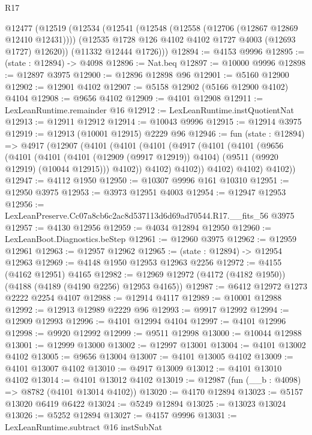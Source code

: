 \begin{lexlean}{R17}
\begin{coremodule}
  @12477
    (@12519
      (@12534
        (@12541
          (@12548 (@12558 (@12706 (@12867 @12869 @12410 @12431))))
          (@12535 @1728 @126 @4102 @4102 @1727 @4003 (@12693 @1727) @12620))
        (@11332 @12444 @1726)))
@12894 := @4153 @9996
@12895 := (state : @12894) -> @4098
@12896 := Nat.beq
@12897 := @10000 @9996
@12898 := @12897 @3975
@12900 := @12896 @12898 @96
@12901 := @5160 @12900
@12902 := @12901 @4102
@12907 := @5158 @12902 (@5166 @12900 @4102) @4104
@12908 := @9656 @4102
@12909 := @4101 @12908
@12911 := LexLeanRuntime.remainder @16
@12912 := LexLeanRuntime.instQuotientNat
@12913 := @12911 @12912
@12914 := @10043 @9996
@12915 := @12914 @3975
@12919 := @12913 (@10001 @12915) @2229 @96
@12946 := fun (state : @12894) =>
  @4917
    (@12907
      (@4101
        (@4101
          (@4101
            (@4917
              (@4101
                (@4101
                  (@9656
                    (@4101
                      (@4101
                        (@4101 (@12909 (@9917 @12919)) @4104)
                        (@9511 (@9920 @12919) (@10044 @12915)))
                      @4102))
                  @4102)
                @4102))
            @4102)
          @4102)
        @4102))
@12947 := @4112 @1950
@12950 := @10307 @9996 @161 @10310
@12951 := @12950 @3975
@12953 := @3973 @12951 @4003
@12954 := @12947 @12953
@12956 := LexLeanPreserve.Cc07a8cb6c2ac8d537113d6d69ad70544.R17.__fits_56 @3975
@12957 := @4130 @12956
@12959 := @4034 @12894 @12950
@12960 := LexLeanBoot.Diagnostics.beStep
@12961 := @12960 @3975
@12962 := @12959 @12961
@12963 := @12957 @12962
@12965 := (state : @12894) -> @12954 @12963
@12969 := @4148 @1950 @12953 @12963 @2256
@12972 := @4155 (@4162 @12951) @4165
@12982 := @12969 @12972 (@4172 (@4182 @1950)) (@4188 (@4189 (@4190 @2256) @12953 @4165))
@12987 := @6412 @12972 @1273 @2222 @2254 @4107
@12988 := @12914 @4117
@12989 := @10001 @12988
@12992 := @12913 @12989 @2229 @96
@12993 := @9917 @12992
@12994 := @12909 @12993
@12996 := @4101 @12994 @4104
@12997 := @4101 @12996
@12998 := @9920 @12992
@12999 := @9511 @12998
@13000 := @10044 @12988
@13001 := @12999 @13000
@13002 := @12997 @13001
@13004 := @4101 @13002 @4102
@13005 := @9656 @13004
@13007 := @4101 @13005 @4102
@13009 := @4101 @13007 @4102
@13010 := @4917 @13009
@13012 := @4101 @13010 @4102
@13014 := @4101 @13012 @4102
@13019 := @12987 (fun (__b : @4098) => @8782 (@4101 @13014 @4102))
@13020 := @4170 @12894
@13023 := @5157 @13020 @6419 @6422
@13024 := @5249 @12894
@13025 := @13023 @13024
@13026 := @5252 @12894
@13027 := @4157 @9996
@13031 := LexLeanRuntime.subtract @16 instSubNat

\end{coremodule}
\end{lexlean}
